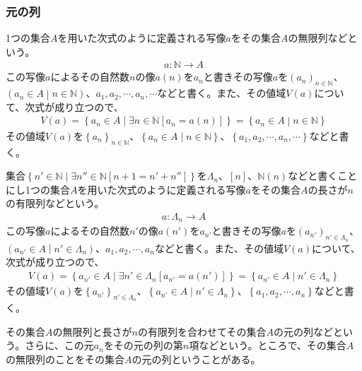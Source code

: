 \documentclass[dvipdfmx]{jsarticle}
\begin{document}
\subsubsection{元の列}%
\begin{dfn}
1つの集合$A$を用いた次式のように定義される写像$a$をその集合$A$の無限列などという。
\begin{align*}
a:\mathbb{N} \rightarrow A
\end{align*}
この写像$a$によるその自然数$n$の像$a(n)$を$a_{n}$と書きその写像$a$を$\left( a_{n} \right)_{n \in \mathbb{N}}$、$\left( a_{n} \in A \middle| n \in \mathbb{N} \right)$、$a_{1},a_{2},\cdots,a_{n},\cdots$などと書く。また、その値域$V(a)$について、次式が成り立つので、
\begin{align*}
V(a) = \left\{ a_{n} \in A \middle| \exists n \in \mathbb{N}\left[ a_{n} = a(n) \right] \right\} = \left\{ a_{n} \in A \middle| n \in \mathbb{N} \right\}
\end{align*}
その値域$V(a)$を$\left\{ a_{n} \right\}_{n \in \mathbb{N}}$、$\left\{ a_{n} \in A \middle| n \in \mathbb{N} \right\}$、$\left\{ a_{1},a_{2},\cdots,a_{n},\cdots \right\}$などと書く。
\end{dfn}
\begin{dfn}
集合$\left\{ n' \in \mathbb{N} \middle| \exists n'' \in \mathbb{N}\left[ n + 1 = n' + n'' \right] \right\}$を$\varLambda_{n}$、$[ n]$、$\mathbb{N}(n)$などと書くことにし1つの集合$A$を用いた次式のように定義される写像$a$をその集合$A$の長さが$n$の有限列などという。
\begin{align*}
a:\varLambda_{n} \rightarrow A
\end{align*}
この写像$a$によるその自然数$n'$の像$a\left( n' \right)$を$a_{n'}$と書きその写像$a$を$\left( a_{n'} \right)_{n' \in {\varLambda}_{n}}$、$\left( a_{n'} \in A \middle| n' \in \varLambda_{n} \right)$、$a_{1},a_{2},\cdots,a_{n}$などと書く。また、その値域$V(a)$について、次式が成り立つので、
\begin{align*}
V(a) = \left\{ a_{n'} \in A \middle| \exists n' \in \varLambda_{n}\left[ a_{n'} = a\left( n' \right) \right] \right\} = \left\{ a_{n'} \in A \middle| n' \in \varLambda_{n} \right\}
\end{align*}
その値域$V(a)$を$\left\{ a_{n'} \right\}_{n' \in \varLambda_{n}}$、$\left\{ a_{n'} \in A \middle| n' \in \varLambda_{n} \right\}$、$\left\{ a_{1},a_{2},\cdots,a_{n} \right\}$などと書く。
\end{dfn}
\begin{dfn}
その集合$A$の無限列と長さが$n$の有限列を合わせてその集合$A$の元の列などという。さらに、この元$a_{n}$をその元の列の第$n$項などという。ところで、その集合$A$の無限列のことをその集合$A$の元の列ということがある。
\end{dfn}
\end{document}
